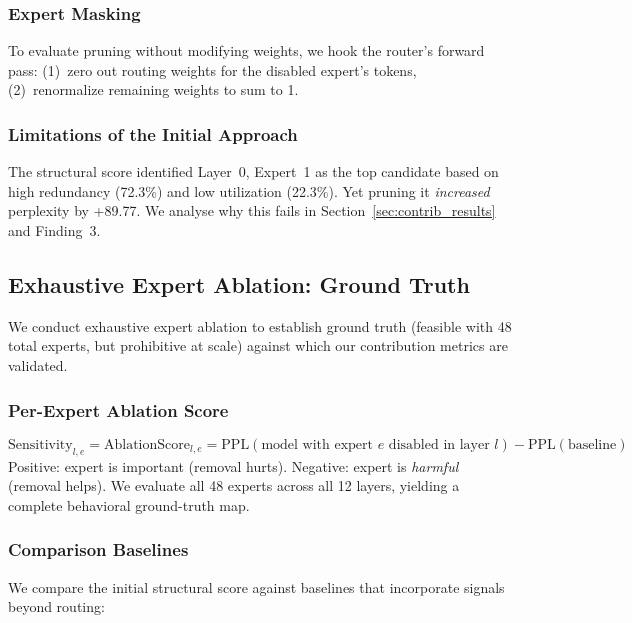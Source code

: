 \documentclass{article}
\begin{document}
\subsubsection{Expert Masking}

To evaluate pruning without modifying weights, we hook the router's forward pass: (1)~zero out routing weights for the disabled expert's tokens, (2)~renormalize remaining weights to sum to 1.

\subsubsection{Limitations of the Initial Approach}

The structural score identified Layer~0, Expert~1 as the top candidate based on high redundancy (72.3\%) and low utilization (22.3\%). Yet pruning it \emph{increased} perplexity by +89.77. We analyse why this fails in Section~\ref{sec:contrib_results} and Finding~3.

\subsection{Exhaustive Expert Ablation: Ground Truth}

We conduct exhaustive expert ablation to establish ground truth (feasible with 48 total experts, but prohibitive at scale) against which our contribution metrics are validated.

\subsubsection{Per-Expert Ablation Score}

\begin{equation}
\text{Sensitivity}_{l,e} = \text{AblationScore}_{l,e} = \text{PPL}(\text{model with expert } e \text{ disabled in layer } l) - \text{PPL}(\text{baseline})
\label{eq:sensitivity}
\end{equation}
Positive: expert is important (removal hurts). Negative: expert is \emph{harmful} (removal helps). We evaluate all 48 experts across all 12 layers, yielding a complete behavioral ground-truth map.

\subsubsection{Comparison Baselines}

We compare the initial structural score against baselines that incorporate signals beyond routing:
\end{document}
